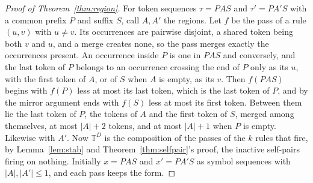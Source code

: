 \documentclass[11pt,a4paper]{article}
\theoremstyle{definition}
\theoremstyle{plain}
\newcommand{\T}{\mathbb{T}}
\begin{document}
\begin{proof}[Proof of Theorem~\ref{thm:region}]
For token sequences \(\tau = PAS\) and \(\tau' = PA'S\) with a common prefix \(P\) and suffix \(S\), call \(A, A'\) the
regions. Let \(f\) be the pass of a rule \((u, v)\) with \(u \ne v\). Its occurrences are pairwise disjoint, a shared
token being both \(v\) and \(u\), and a merge creates none, so the pass merges exactly the occurrences present. An
occurrence inside \(P\) is one in \(PAS\) and conversely, and the last token of \(P\) belongs to an occurrence crossing
the end of \(P\) only as its \(u\), with the first token of \(A\), or of \(S\) when \(A\) is empty, as its \(v\). Then
\(f(PAS)\) begins with \(f(P)\) less at most its last token, which is the last token of \(P\), and by the mirror
argument ends with \(f(S)\) less at most its first token. Between them lie the last token of \(P\), the tokens of \(A\)
and the first token of \(S\), merged among themselves, at most \(|A| + 2\) tokens, and at most \(|A| + 1\) when \(P\) is
empty. Likewise with \(A'\). Now \(\T^D\) is the composition of the passes of the \(k\) rules that fire, by
Lemma~\ref{lem:stab} and Theorem~\ref{thm:selfpair}'s proof, the inactive self-pairs firing on nothing. Initially
\(x = PAS\) and \(x' = PA'S\) as symbol sequences with \(|A|, |A'| \le 1\), and each pass keeps the form.


\end{proof}
\end{document}

